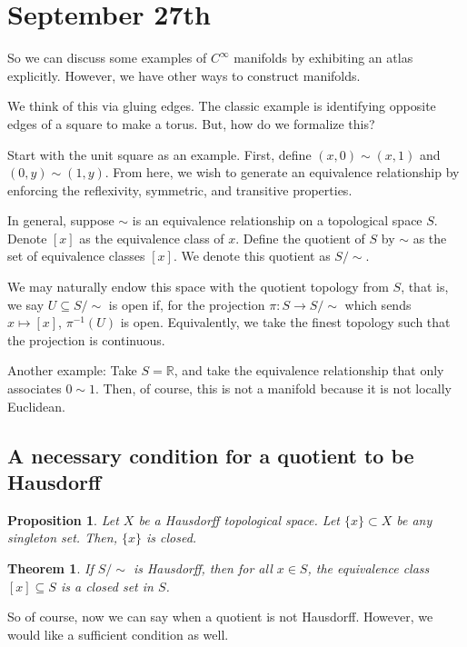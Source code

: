 \documentclass[10pt]{article}
\newtheorem{theorem}{Theorem}[section]
\newtheorem{proposition}{Proposition}[section]
\begin{document}
\section{September 27th}

So we can discuss some examples of $C^\infty$ manifolds by exhibiting an atlas explicitly. However, we have other ways to construct manifolds.

We think of this via gluing edges. The classic example is identifying opposite edges of a square to make a torus. But, how do we formalize this?

Start with the unit square as an example. First, define $(x,0) \sim (x,1)$ and $(0,y) \sim (1,y)$. From here, we wish to generate an equivalence relationship by enforcing the reflexivity, symmetric, and transitive properties. 

In general, suppose $\sim$ is an equivalence relationship on a topological space $S$. Denote $[x]$ as the equivalence class of $x$. Define the quotient of $S$ by $\sim$ as the set of equivalence classes $[x]$. We denote this quotient as $S/\sim$.

We may naturally endow this space with the quotient topology from $S$, that is, we say $U \subseteq S/\sim$ is open if, for the projection $\pi: S \to S/\sim$ which sends $x \mapsto [x]$, $\pi^{-1}(U)$ is open. Equivalently, we take the finest topology such that the projection is continuous.

Another example: Take $S = \mathbb{R}$, and take the equivalence relationship that only associates $0 \sim 1$. Then, of course, this is not a manifold because it is not locally Euclidean.

\subsection{A necessary condition for a quotient to be Hausdorff}

\begin{proposition}
Let $X$ be a Hausdorff topological space. Let $\{ x \} \subset X$ be any singleton set. Then, $\{ x \}$ is closed.
\end{proposition}

\begin{theorem}
If $S / \sim$ is Hausdorff, then for all $x \in S$, the equivalence class $[x] \subseteq S$ is a closed set in $S$.
\end{theorem}

So of course, now we can say when a quotient is not Hausdorff. However, we would like a sufficient condition as well.
\end{document}
